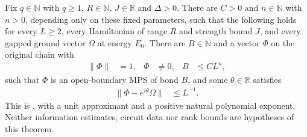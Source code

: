 \begin{theorem}
    \label{thm:chain_protocol_mps_approximation}
    \leanok
    Fix $q\in\mathbb N$ with $q\ge1$, $R\in\mathbb N$,
    $J\in\mathbb R$ and $\Delta>0$. There are $C>0$ and
    $n\in\mathbb N$ with $n>0$, depending only on these fixed
    parameters, such that the following holds for every $L\ge2$,
    every Hamiltonian of range $R$ and strength bound $J$, and every
    gapped ground vector $\Omega$ at energy $E_0$.
    There are $B\in\mathbb N$ and a vector $\Phi$ on the original
    chain with
    \begin{align}
        \|\Phi\| & =1, & \Phi & \ne0, & B & \le CL^n,
        \label{eq:chain_protocol_headline_bond}
    \end{align}
    such that $\Phi$ is an open-boundary MPS of bond $B$, and some
    $\theta\in\mathbb R$ satisfies
    \begin{align}
        \|\Phi-e^{i\theta}\Omega\| & \le L^{-1}.
        \label{eq:chain_protocol_headline_error}
    \end{align}
    This is \cite[Theorem~B]{TNLean2026OneDimensional}, with a unit
    approximant and a positive natural polynomial exponent. Neither
    information estimates, circuit data nor rank bounds are hypotheses
    of this theorem.
\end{theorem}
